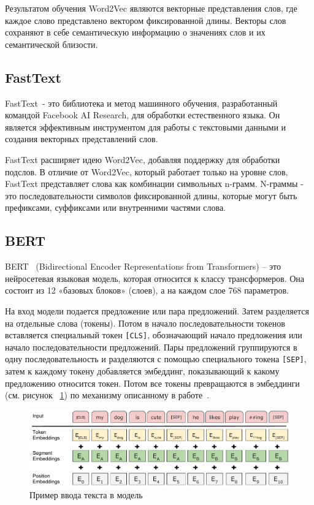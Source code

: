 \documentclass[PI, VKR]{HSEUniversity}
\begin{document}
Результатом обучения Word2Vec являются векторные представления слов, где каждое слово представлено вектором фиксированной длины. Векторы слов сохраняют в себе семантическую информацию о значениях слов и их семантической близости.
\subsection{FastText}
\label{sec:org02e1047}
FastText~\autocite{joulin_bag_2016}- это библиотека и метод машинного обучения, разработанный командой Facebook AI Research, для обработки естественного языка. Он является эффективным инструментом для работы с текстовыми данными и создания векторных представлений слов.

FastText расширяет идею Word2Vec, добавляя поддержку для обработки подслов. В отличие от Word2Vec, который работает только на уровне слов, FastText представляет слова как комбинации символьных n-грамм. N-граммы - это последовательности символов фиксированной длины, которые могут быть префиксами, суффиксами или внутренними частями слова.
\subsection{BERT}
\label{sec:org21fb1af}
BERT~\autocite{devlin_bert_2019} (Bidirectional Encoder Representations from Transformers) -- это нейросетевая языковая модель, которая относится к классу трансформеров. Она состоит из 12 «базовых блоков» (слоев), а на каждом слое 768 параметров.

На вход модели подается предложение или пара предложений. Затем разделяется на отдельные слова (токены). Потом в начало последовательности токенов вставляется специальный токен \texttt{[CLS]}, обозначающий начало предложения или начало последовательности предложений. Пары предложений группируются в одну последовательность и разделяются с помощью специального токена \texttt{[SEP]}, затем к каждому токену добавляется эмбеддинг, показывающий к какому предложению относится токен. Потом все токены превращаются в эмбеддинги (см. рисунок ~\ref{fig:inputemebeddings}) по механизму описанному в работе~\autocite{vaswani_attention_2017}.

\begin{figure}[h]
\centering
\includegraphics[width=.9\linewidth]{img/Input_Emebeddings.pdf}
\caption{\label{fig:inputemebeddings}Пример ввода текста в модель}
\end{figure}
\end{document}
